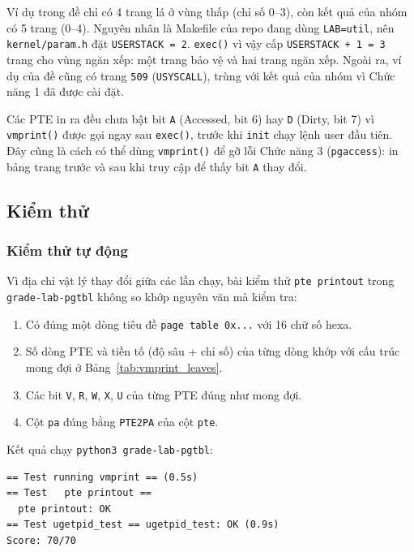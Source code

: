\begin{calloutnote}
    Ví dụ trong đề chỉ có 4 trang lá ở vùng thấp (chỉ số 0--3), còn kết quả của nhóm có 5 trang (0--4). Nguyên nhân là Makefile của repo đang dùng \texttt{LAB=util}, nên \texttt{kernel/param.h} đặt \texttt{USERSTACK = 2}. \texttt{exec()} vì vậy cấp \texttt{USERSTACK + 1 = 3} trang cho vùng ngăn xếp: một trang bảo vệ và hai trang ngăn xếp. Ngoài ra, ví dụ của đề cũng có trang \texttt{509} (\texttt{USYSCALL}), trùng với kết quả của nhóm vì Chức năng 1 đã được cài đặt.
\end{calloutnote}

\begin{callouttip}
    Các PTE in ra đều chưa bật bit \texttt{A} (Accessed, bit 6) hay \texttt{D} (Dirty, bit 7) vì \texttt{vmprint()} được gọi ngay sau \texttt{exec()}, trước khi \texttt{init} chạy lệnh user đầu tiên. Đây cũng là cách có thể dùng \texttt{vmprint()} để gỡ lỗi Chức năng 3 (\texttt{pgaccess}): in bảng trang trước và sau khi truy cập để thấy bit \texttt{A} thay đổi.
\end{callouttip}

\subsection{Kiểm thử}

\subsubsection{Kiểm thử tự động}
Vì địa chỉ vật lý thay đổi giữa các lần chạy, bài kiểm thử \texttt{pte printout} trong \texttt{grade-lab-pgtbl} không so khớp nguyên văn mà kiểm tra:
\begin{enumerate}
    \item Có đúng một dòng tiêu đề \texttt{page table 0x...} với 16 chữ số hexa.
    \item Số dòng PTE và tiền tố (độ sâu + chỉ số) của từng dòng khớp với cấu trúc mong đợi ở Bảng~\ref{tab:vmprint_leaves}.
    \item Các bit \texttt{V}, \texttt{R}, \texttt{W}, \texttt{X}, \texttt{U} của từng PTE đúng như mong đợi.
    \item Cột \texttt{pa} đúng bằng \texttt{PTE2PA} của cột \texttt{pte}.
\end{enumerate}

\noindent Kết quả chạy \texttt{python3 grade-lab-pgtbl}:
\begin{center}
\begin{minipage}{0.92\textwidth}
\begin{lstlisting}[numbers=none,xleftmargin=0pt,framexleftmargin=0pt]
== Test running vmprint == (0.5s)
== Test   pte printout ==
  pte printout: OK
== Test ugetpid_test == ugetpid_test: OK (0.9s)
Score: 70/70
\end{lstlisting}
\end{minipage}
\end{center}

